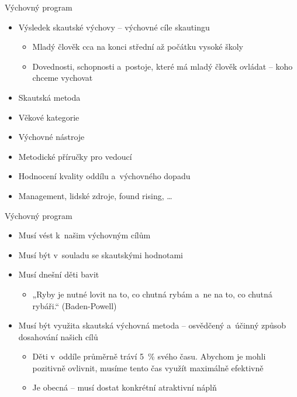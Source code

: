 \documentclass[compress,xelatex,xcolor=dvipsnames,print]{beamer}
\begin{document}
\begin{frame}{Výchovný program}
\begin{itemize}
\item Výsledek skautské výchovy -- výchovné cíle skautingu
 \begin{itemize}
 \item Mladý člověk cca na konci střední až počátku vysoké školy
 \item Dovednosti, schopnosti a~postoje, které má mladý člověk ovládat -- koho chceme vychovat
 \end{itemize}
\item Skautská metoda
\item Věkové kategorie
\item Výchovné nástroje
\item Metodické příručky pro vedoucí
\item Hodnocení kvality oddílu a~výchovného dopadu
\item Management, lidské zdroje, found rising, \ldots
\end{itemize}
\end{frame}

\begin{frame}{Výchovný program}
\begin{itemize}
\item Musí vést k~našim výchovným cílům
\item Musí být v~souladu se skautskými hodnotami
\item Musí dnešní děti bavit
 \begin{itemize}
 \item „Ryby je nutné lovit na to, co chutná rybám a~ne na to, co chutná rybáři.“ (Baden-Powell)
 \end{itemize}
\item Musí být využita skautská výchovná metoda -- osvědčený a~účinný způsob dosahování našich cílů
 \begin{itemize}
 \item Děti v~oddíle průměrně tráví 5~\% svého času. Abychom je mohli pozitivně ovlivnit, musíme tento čas využít maximálně efektivně
 \item Je obecná -- musí dostat konkrétní atraktivní náplň
 \end{itemize}
\end{itemize}
\end{frame}
\end{document}
